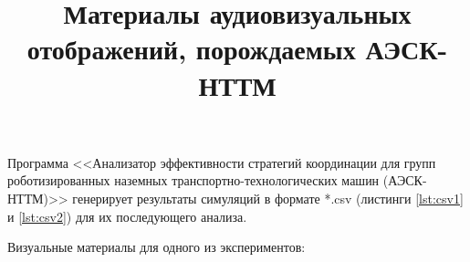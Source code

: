 

\title{Материалы аудиовизуальных отображений, порождаемых АЭСК-НТТМ}



\maketitle

Программа <<Анализатор эффективности стратегий координации для групп роботизированных наземных транспортно-технологических машин (АЭСК-НТТМ)>> генерирует результаты симуляций в формате *.csv (листинги \ref{lst:csv1} и \ref{lst:csv2}) для их последующего анализа.

Визуальные материалы для одного из экспериментов:

\begingroup

\endgroup

\clearpage

\begingroup

\endgroup


